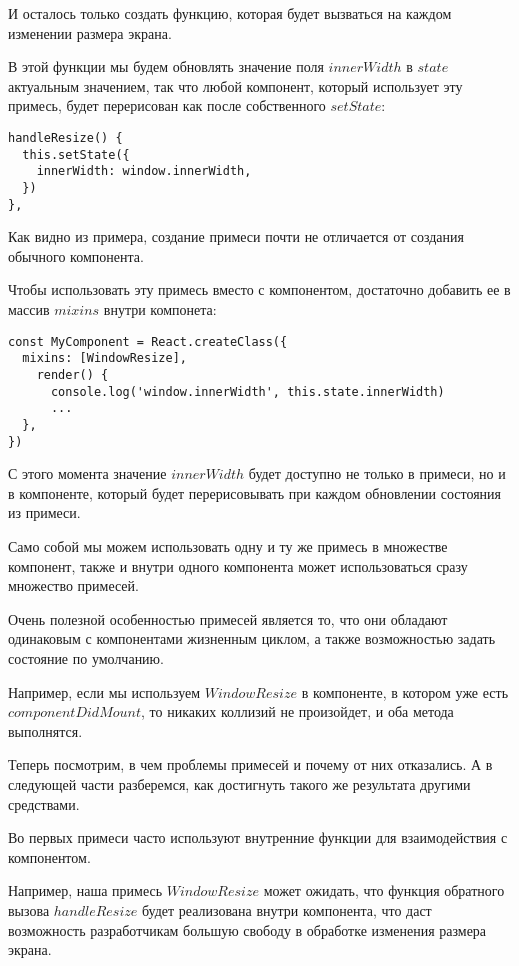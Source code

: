 И осталось только создать функцию, которая будет вызваться на каждом изменении размера экрана.

В этой функции мы будем обновлять значение поля $innerWidth$ в $state$ актуальным значением, так что любой компонент, который использует эту примесь, будет перерисован как после собственного $setState$:

\begin{lstlisting}
handleResize() {
  this.setState({
    innerWidth: window.innerWidth,
  })
},
\end{lstlisting}

Как видно из примера, создание примеси почти не отличается от создания обычного компонента.

Чтобы использовать эту примесь вместо с компонентом, достаточно добавить ее в массив $mixins$ внутри компонета:

\begin{lstlisting}
const MyComponent = React.createClass({
  mixins: [WindowResize],
    render() {
      console.log('window.innerWidth', this.state.innerWidth)
      ...
  }, 
})
\end{lstlisting}

С этого момента значение $innerWidth$ будет доступно не только в примеси, но и в компоненте, который будет перерисовывать при каждом обновлении состояния из примеси.

Само собой мы можем использовать одну и ту же примесь в множестве компонент, также и внутри одного компонента может использоваться сразу множество примесей.

Очень полезной особенностью примесей является то, что они обладают одинаковым с компонентами жизненным циклом, а также возможностью задать состояние по умолчанию.

Например, если мы используем $WindowResize$ в компоненте, в котором уже есть $componentDidMount$, то никаких коллизий не произойдет, и оба метода выполнятся.

Теперь посмотрим, в чем проблемы примесей и почему от них отказались. А в следующей части разберемся, как достигнуть такого же результата другими средствами.

Во первых примеси часто используют внутренние функции для взаимодействия с компонентом.

Например, наша примесь $WindowResize$ может ожидать, что функция обратного вызова $handleResize$ будет реализована внутри компонента, что даст возможность разработчикам большую свободу в обработке изменения размера экрана.

